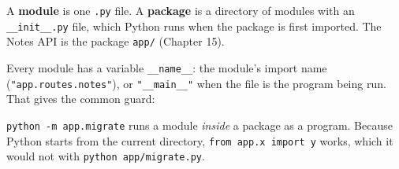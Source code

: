 \label{44-appendices:g1-modules-packages-and-running-code}

A \textbf{module} is one \texttt{.py} file. A \textbf{package} is a directory of modules with an \texttt{\_\_init\_\_.py} file, which Python runs when the package is first imported. The Notes API is the package \texttt{app/} (Chapter 15).

\begin{codebox}[short]

\begin{Shaded}
\begin{Highlighting}[]
\end{Highlighting}
\end{Shaded}

\end{codebox}

\noindent{}Every module has a variable \texttt{\_\_name\_\_}: the module's import name (\texttt{"app.routes.notes"}), or \texttt{"\_\_main\_\_"} when the file is the program being run. That gives the common guard:

\begin{codebox}[short]

\begin{Shaded}
\begin{Highlighting}[]
\OperatorTok{{-}\textgreater{}} \NormalTok{:}
     


  \OperatorTok{==} \NormalTok{:  }
\end{Highlighting}
\end{Shaded}

\end{codebox}

\noindent{}\texttt{python\ -m\ app.migrate} runs a module \emph{inside} a package as a program. Because Python starts from the current directory, \texttt{from\ app.x\ import\ y} works, which it would not with \texttt{python\ app/}\allowbreak{}\texttt{migrate.py}.

